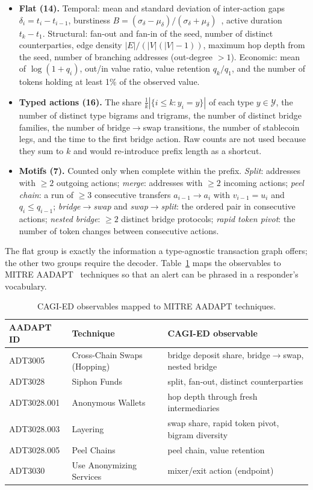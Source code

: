 \begin{itemize}
\item \textbf{Flat (14).} Temporal: mean and standard deviation of inter-action gaps $\delta_i=t_{i}-t_{i-1}$, burstiness $B=(\sigma_\delta-\mu_\delta)/(\sigma_\delta+\mu_\delta)$~\cite{goh2008burstiness}, active duration $t_k-t_1$.
Structural: fan-out and fan-in of the seed, number of distinct counterparties, edge density $|E|/(|V|(|V|-1))$, maximum hop depth from the seed, number of branching addresses (out-degree $>1$).
Economic: mean of $\log(1+q_i)$, out/in value ratio, value retention $q_k/q_1$, and the number of tokens holding at least 1\% of the observed value.
\item \textbf{Typed actions (16).} The share $\frac1k|\{i\le k:y_i=y\}|$ of each type $y\in\mathcal{Y}$, the number of distinct type bigrams and trigrams, the number of distinct bridge families, the number of bridge$\to$swap transitions, the number of stablecoin legs, and the time to the first bridge action.
Raw counts are not used because they sum to $k$ and would re-introduce prefix length as a shortcut.
\item \textbf{Motifs (7).} Counted only when complete within the prefix. \emph{Split}: addresses with $\ge2$ outgoing actions; \emph{merge}: addresses with $\ge2$ incoming actions; \emph{peel chain}: a run of $\ge3$ consecutive transfers $a_{i-1}\to a_i$ with $v_{i-1}=u_i$ and $q_i\le q_{i-1}$; \emph{bridge$\to$swap} and \emph{swap$\to$split}: the ordered pair in consecutive actions; \emph{nested bridge}: $\ge2$ distinct bridge protocols; \emph{rapid token pivot}: the number of token changes between consecutive actions.
\end{itemize}
The flat group is exactly the information a type-agnostic transaction graph offers; the other two groups require the decoder.
Table~\ref{tab:aadapt} maps the observables to MITRE AADAPT~\cite{mitre2025aadapt} techniques so that an alert can be phrased in a responder's vocabulary.

\begin{table}[t]
\centering
\caption{CAGI-ED observables mapped to MITRE AADAPT techniques.}
\label{tab:aadapt}
\setlength{\tabcolsep}{4pt}
\small
\begin{tabular}{@{}llp{5.1cm}@{}}
\toprule
AADAPT ID & Technique & CAGI-ED observable \\
\midrule
ADT3005 & Cross-Chain Swaps (Hopping) & bridge deposit share, bridge$\to$swap, nested bridge \\
ADT3028 & Siphon Funds & split, fan-out, distinct counterparties \\
ADT3028.001 & Anonymous Wallets & hop depth through fresh intermediaries \\
ADT3028.003 & Layering & swap share, rapid token pivot, bigram diversity \\
ADT3028.005 & Peel Chains & peel chain, value retention \\
ADT3030 & Use Anonymizing Services & mixer/exit action (endpoint) \\
\bottomrule
\end{tabular}
\end{table}

